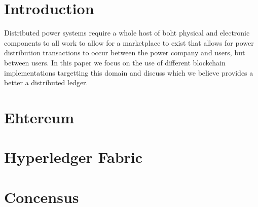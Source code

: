 \documentclass[a4paper,10pt]{article}
\title{}
\author{}
\begin{document}
\maketitle

\begin{abstract}

\end{abstract}

\section{Introduction}

Distributed power systems require a whole host of boht physical and electronic components to all work to allow for a marketplace to exist that allows for power distribution transactions to occur between the power company and users, but between users. In this paper we focus on the use of different blockchain implementations targetting this domain and discuss which we believe provides a better a distributed ledger.

\section{Ehtereum}



\section{Hyperledger Fabric}




\section{Concensus}
\end{document}
